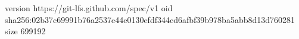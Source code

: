version https://git-lfs.github.com/spec/v1
oid sha256:02b37c69991b76a2537e44e0130efdf344cd6afbf39b978ba5abb8d13d760281
size 699192
